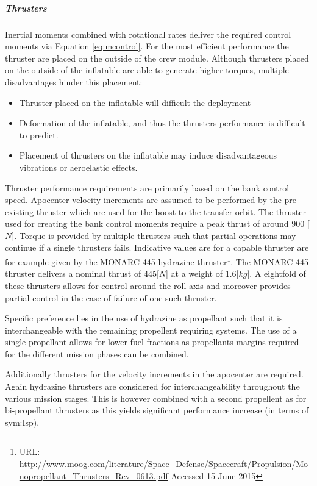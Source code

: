 \subparagraph{Thrusters}
Inertial moments combined with rotational rates deliver the required control moments via Equation \ref{eq:mcontrol}. For the most efficient performance the thruster are placed on the outside of the crew module. Although thrusters placed on the outside of the inflatable are able to generate higher torques, multiple disadvantages hinder this placement:

\begin{itemize}
\item Thruster placed on the inflatable will difficult the deployment
\item Deformation of the inflatable, and thus the thrusters performance is difficult to predict.
\item Placement of thrusters on the inflatable may induce disadvantageous vibrations or aeroelastic effects.  
\end{itemize} 

Thruster performance requirements are primarily based on the bank control speed. Apocenter velocity increments are assumed to be performed by the pre-existing thruster which are used for the boost to the transfer orbit. The thruster used for creating the bank control moments require a peak thrust of around 900 [$N$]. Torque is provided by multiple thrusters such that partial operations may continue if a single thrusters fails.
 Indicative values are for a capable thruster are for example given by the  MONARC-445 hydrazine thruster\footnote{URL: \url{http://www.moog.com/literature/Space\_Defense/Spacecraft/Propulsion/Monopropellant\_Thrusters\_Rev\_0613.pdf} Accessed 15 June 2015}. The MONARC-445 thruster delivers a nominal thrust of 445[$N$] at a weight of 1.6[$kg$].  A eightfold of these thrusters allows for control around the roll axis and moreover provides partial control in the case of failure of one such thruster.
 
Specific preference lies in the use of hydrazine as propellant such that it is interchangeable with the remaining propellent requiring systems. The use of a single propellant allows for lower fuel fractions as propellants margins required for the different mission phases can be combined.

Additionally thrusters for the velocity increments in the apocenter are required. Again hydrazine thrusters are considered for interchangeability throughout the various mission stages. This is however combined with a second propellent as for bi-propellant thrusters as this yields significant performance increase (in terms of \gls{sym:Isp})\cite{Wertz2011}. 

